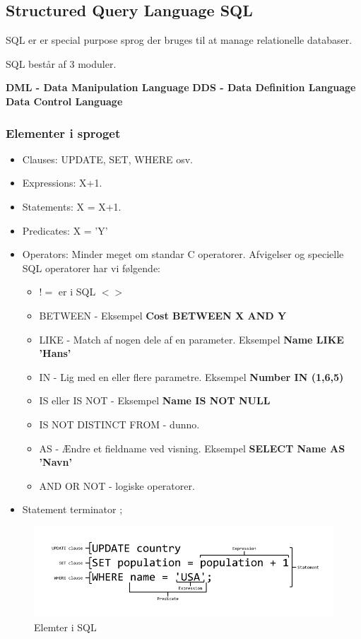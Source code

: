 \newpage

\subsection{Structured Query Language SQL}
SQL er er special purpose sprog der bruges til at manage relationelle databaser.

SQL består af 3 moduler.

\textbf{DML - Data Manipulation Language}
\textbf{DDS - Data Definition Language}
\textbf{Data Control Language}

\subsubsection{Elementer i sproget}

\begin{itemize}
	\item Clauses: UPDATE, SET, WHERE osv.
	\item Expressions: X+1.
	\item Statements: X = X+1.
	\item Predicates: X = 'Y'
	\item Operators: Minder meget om standar C operatorer. Afvigelser og specielle SQL operatorer har vi følgende:
	\begin{itemize}
		\item $!=$ er i SQL $<>$
		\item BETWEEN - Eksempel \textbf{Cost BETWEEN X AND Y}
		\item LIKE - Match af nogen dele af en parameter. Eksempel \textbf{Name LIKE 'Hans'}
		\item IN - Lig med en eller flere parametre. Eksempel \textbf{Number IN (1,6,5)}
		\item IS eller IS NOT - Eksempel \textbf{Name IS NOT NULL}
		\item IS NOT DISTINCT FROM - dunno.
		\item AS - Ændre et fieldname ved visning. Eksempel \textbf{SELECT Name AS 'Navn'}
		\item AND OR NOT - logiske operatorer.
	\end{itemize}
	\item Statement terminator ;
	
\end{itemize}

\begin{figure}
\centering
\includegraphics[width=0.9\linewidth]{figs/spm7/sqlDecomp}
\caption{Elemter i SQL}
\label{fig:sqlDecomp}
\end{figure}

